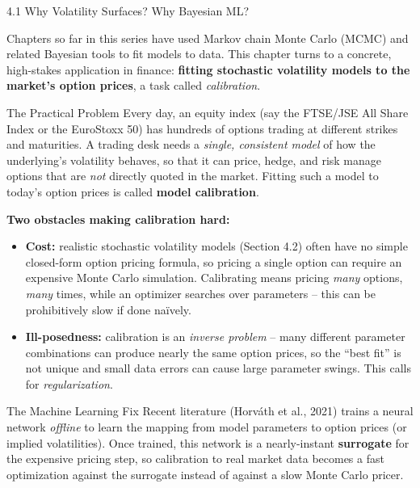 \documentclass[aspectratio=169,10pt]{beamer}
\begin{document}
\begin{frame}[allowframebreaks]{4.1 Why Volatility Surfaces? Why Bayesian ML?}

Chapters so far in this series have used Markov chain Monte Carlo (MCMC) and
related Bayesian tools to fit models to data. This chapter turns to a
concrete, high-stakes application in finance: \textbf{fitting stochastic
volatility models to the market's option prices}, a task called
\emph{calibration}.

\begin{block}{The Practical Problem}
Every day, an equity index (say the FTSE/JSE All Share Index or the
EuroStoxx 50) has hundreds of options trading at different strikes and
maturities. A trading desk needs a \emph{single, consistent model} of how
the underlying's volatility behaves, so that it can price, hedge, and risk
manage options that are \emph{not} directly quoted in the market. Fitting
such a model to today's option prices is called \textbf{model calibration}.
\end{block}

\framebreak

\textbf{Two obstacles making calibration hard:}
\begin{itemize}
  \item \textbf{Cost:} realistic stochastic volatility models (Section 4.2)
        often have no simple closed-form option pricing formula, so
        pricing a single option can require an expensive Monte Carlo
        simulation. Calibrating means pricing \emph{many} options,
        \emph{many} times, while an optimizer searches over parameters --
        this can be prohibitively slow if done na\"ively.
  \item \textbf{Ill-posedness:} calibration is an \emph{inverse problem} --
        many different parameter combinations can produce nearly the same
        option prices, so the ``best fit'' is not unique and small data
        errors can cause large parameter swings. This calls for
        \emph{regularization}.
\end{itemize}

\begin{alertblock}{The Machine Learning Fix}
Recent literature (Horv\'ath et al., 2021) trains a neural network
\emph{offline} to learn the mapping from model parameters to option prices
(or implied volatilities). Once trained, this network is a nearly-instant
\textbf{surrogate} for the expensive pricing step, so calibration to real
market data becomes a fast optimization against the surrogate instead of
against a slow Monte Carlo pricer.
\end{alertblock}


\end{frame}
\end{document}
